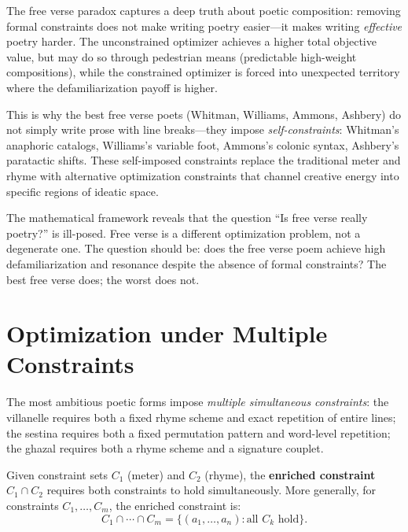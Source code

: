 \begin{interpretation}
\label{interp:free-verse}
The free verse paradox captures a deep truth about poetic composition: removing
formal constraints does not make writing poetry easier---it makes writing
\emph{effective} poetry harder.  The unconstrained optimizer achieves a higher
total objective value, but may do so through pedestrian means (predictable
high-weight compositions), while the constrained optimizer is forced into
unexpected territory where the defamiliarization payoff is higher.

This is why the best free verse poets (Whitman, Williams, Ammons, Ashbery) do
not simply write prose with line breaks---they impose \emph{self-constraints}:
Whitman's anaphoric catalogs, Williams's variable foot, Ammons's colonic
syntax, Ashbery's paratactic shifts.  These self-imposed constraints replace
the traditional meter and rhyme with alternative optimization constraints that
channel creative energy into specific regions of ideatic space.

The mathematical framework reveals that the question ``Is free verse really
poetry?'' is ill-posed.  Free verse is a different optimization problem, not
a degenerate one.  The question should be: does the free verse poem achieve
high defamiliarization and resonance despite the absence of formal constraints?
The best free verse does; the worst does not.
\end{interpretation}


\section{Optimization under Multiple Constraints}

The most ambitious poetic forms impose \emph{multiple simultaneous constraints}:
the villanelle requires both a fixed rhyme scheme and exact repetition of
entire lines; the sestina requires both a fixed permutation pattern and
word-level repetition; the ghazal requires both a rhyme scheme and a
signature couplet.

\begin{definition}
\label{def:constraint-enrichment}
Given constraint sets $C_1$ (meter) and $C_2$ (rhyme), the
\textbf{enriched constraint} $C_1 \cap C_2$ requires both constraints to
hold simultaneously.  More generally, for constraints
$C_1, \ldots, C_m$, the enriched constraint is:
\[
  C_1 \cap \cdots \cap C_m
  = \{(a_1, \ldots, a_n) : \text{all $C_k$ hold}\}.
\]
\end{definition}

